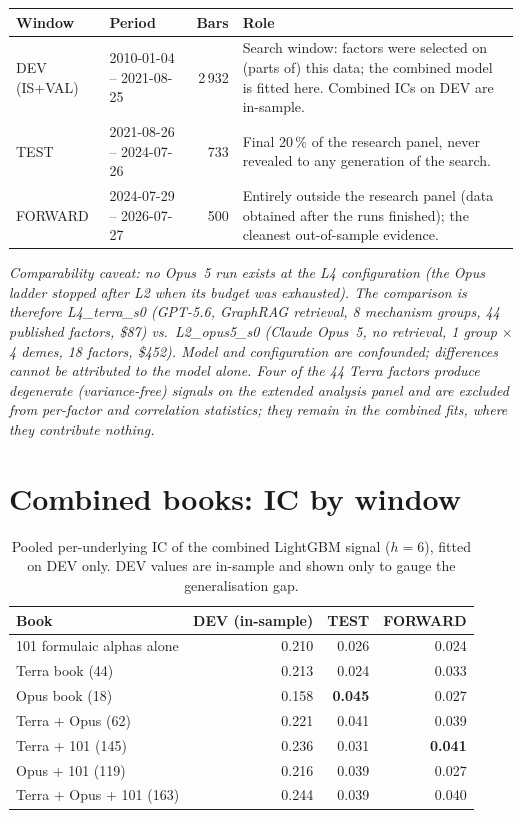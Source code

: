 \documentclass[11pt,a4paper]{article}
\begin{document}
\begin{table}[H]
\centering\small
\begin{tabular}{@{}llrp{6.4cm}@{}}
\toprule
\textbf{Window} & \textbf{Period} & \textbf{Bars} & \textbf{Role} \\
\midrule
DEV (IS+VAL) & 2010-01-04 -- 2021-08-25 & 2\,932 &
Search window: factors were selected on (parts of) this data; the combined model
is fitted here. Combined ICs on DEV are in-sample. \\
TEST & 2021-08-26 -- 2024-07-26 & 733 &
Final 20\,\% of the research panel, never revealed to any generation of the
search. \\
FORWARD & 2024-07-29 -- 2026-07-27 & 500 &
Entirely outside the research panel (data obtained after the runs finished); the
cleanest out-of-sample evidence. \\
\bottomrule
\end{tabular}
\end{table}

\noindent\textit{\small\color{grey}Comparability caveat: no Opus~5 run exists at
the L4 configuration (the Opus ladder stopped after L2 when its budget was
exhausted). The comparison is therefore L4\_terra\_s0 (GPT-5.6, GraphRAG
retrieval, 8 mechanism groups, 44 published factors, \$87) vs.\ L2\_opus5\_s0
(Claude Opus~5, no retrieval, 1 group $\times$ 4 demes, 18 factors, \$452). Model
and configuration are confounded; differences cannot be attributed to the model
alone. Four of the 44 Terra factors produce degenerate (variance-free) signals on
the extended analysis panel and are excluded from per-factor and correlation
statistics; they remain in the combined fits, where they contribute nothing.}

\section{Combined books: IC by window}

\begin{table}[H]
\centering\small
\begin{tabular}{@{}lrrr@{}}
\toprule
\textbf{Book} & \textbf{DEV (in-sample)} & \textbf{TEST} & \textbf{FORWARD} \\
\midrule
101 formulaic alphas alone  & 0.210 & 0.026 & 0.024 \\
Terra book (44)             & 0.213 & 0.024 & 0.033 \\
Opus book (18)              & 0.158 & \textbf{0.045} & 0.027 \\
Terra + Opus (62)           & 0.221 & 0.041 & 0.039 \\
Terra + 101 (145)           & 0.236 & 0.031 & \textbf{0.041} \\
Opus + 101 (119)            & 0.216 & 0.039 & 0.027 \\
Terra + Opus + 101 (163)    & 0.244 & 0.039 & 0.040 \\
\bottomrule
\end{tabular}
\caption{Pooled per-underlying IC of the combined LightGBM signal ($h=6$), fitted
on DEV only. DEV values are in-sample and shown only to gauge the generalisation
gap.}
\end{table}
\end{document}
